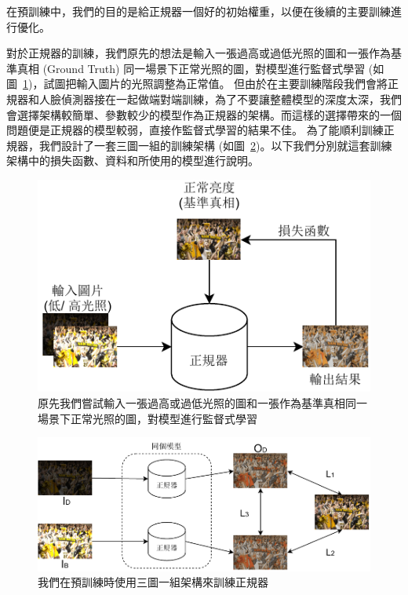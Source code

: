 在預訓練中，我們的目的是給正規器一個好的初始權重，以便在後續的主要訓練進行優化。

對於正規器的訓練，我們原先的想法是輸入一張過高或過低光照的圖和一張作為基準真相 (Ground Truth) 同一場景下正常光照的圖，對模型進行監督式學習 (如圖~\ref{fig:original_pretrain})，試圖把輸入圖片的光照調整為正常值。
但由於在主要訓練階段我們會將正規器和人臉偵測器接在一起做端對端訓練，為了不要讓整體模型的深度太深，我們會選擇架構較簡單、參數較少的模型作為正規器的架構。而這樣的選擇帶來的一個問題便是正規器的模型較弱，直接作監督式學習的結果不佳。
為了能順利訓練正規器，我們設計了一套三圖一組的訓練架構 (如圖~\ref{fig:triple_setting})。以下我們分別就這套訓練架構中的損失函數、資料和所使用的模型進行說明。

\begin{figure}[htb]
\centering
\includegraphics[width=1\textwidth]{figures/original_pretrain}
\caption[預訓練時我們嘗試過的架構]{原先我們嘗試輸入一張過高或過低光照的圖和一張作為基準真相同一場景下正常光照的圖，對模型進行監督式學習}
\label{fig:original_pretrain}
\end{figure}

\begin{figure}[htb]
\centering
\includegraphics[width=1\textwidth]{figures/triple_setting}
\caption[預訓練時所採用的架構]{我們在預訓練時使用三圖一組架構來訓練正規器}
\label{fig:triple_setting}
\end{figure}

